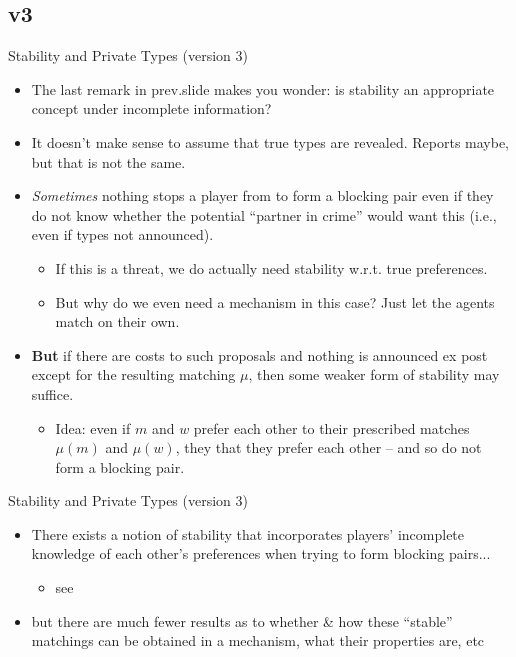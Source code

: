 \documentclass[english,10pt
,aspectratio=169
]{beamer}
\begin{document}
\subsection{v3}

\begin{frame}{Stability and Private Types (version 3)}
\begin{itemize}
	\item The last remark in prev.slide makes you wonder: is \alert{stability} an appropriate concept under incomplete information?
	\item It doesn't make sense to assume that true types are revealed. Reports maybe, but that is not the same.
	\item \emph{Sometimes} nothing stops a player from  to form a blocking pair even if they do not know whether the potential ``partner in crime'' would want this (i.e., even if types not announced).
	\begin{itemize}
		\item If this is a threat, we do actually need stability w.r.t. true preferences.
		\item But why do we even need a mechanism in this case? Just let the agents match on their own.
	\end{itemize}
	\item \textbf{But} if there are costs to such proposals and nothing is announced ex post except for the resulting matching $\mu$, then some weaker form of stability may suffice.
	\begin{itemize}
		\item Idea: even if $m$ and $w$ prefer each other to their prescribed matches $\mu(m)$ and $\mu(w)$, they  that they prefer each other -- and so do not form a blocking pair.
	\end{itemize}
\end{itemize}
\end{frame}


\begin{frame}{Stability and Private Types (version 3)}
\begin{itemize}
	\item There exists a notion of stability that incorporates players' incomplete knowledge of each other's preferences when trying to form blocking pairs...
	\begin{itemize}
		\item see \cite{liu_stability_2020}
	\end{itemize}
	\item but there are much fewer results as to whether \& how these ``stable'' matchings can be obtained in a mechanism, what their properties are, etc
\end{itemize}
\end{frame}
\end{document}
